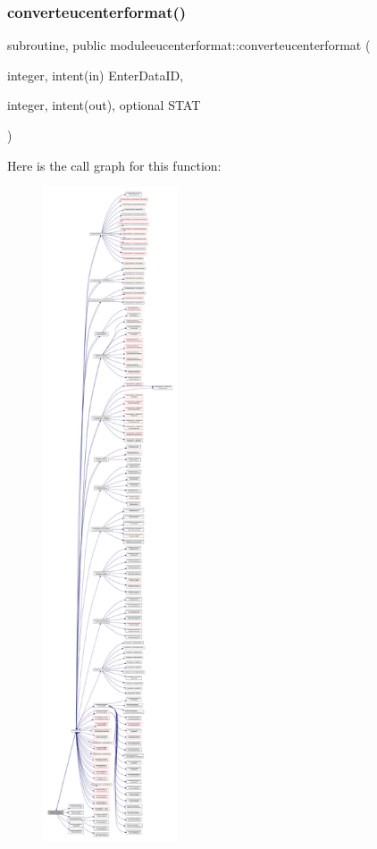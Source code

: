 \subsubsection{\texorpdfstring{converteucenterformat()}{converteucenterformat()}}
{\footnotesize\ttfamily subroutine, public moduleeucenterformat\+::converteucenterformat (\begin{DoxyParamCaption}\item[{integer, intent(in)}]{Enter\+Data\+ID,  }\item[{integer, intent(out), optional}]{S\+T\+AT }\end{DoxyParamCaption})}

Here is the call graph for this function\+:\nopagebreak
\begin{figure}[H]
\begin{center}
\leavevmode
\includegraphics[height=550pt]{namespacemoduleeucenterformat_aa12d33b733be8e990e1050000343f7ed_cgraph}
\end{center}
\end{figure}
